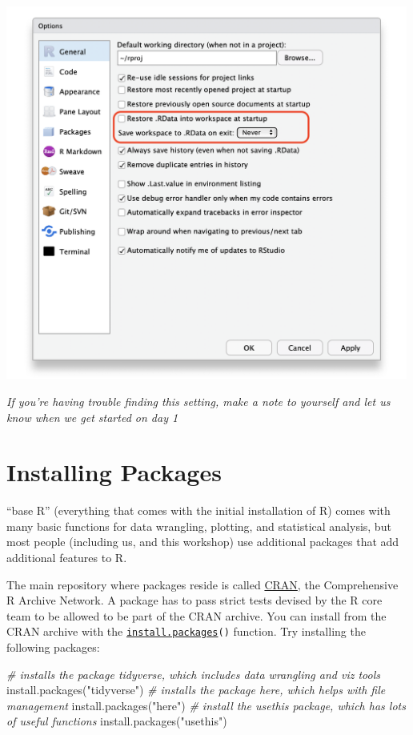 \documentclass[
]{article}
\newenvironment{Shaded}{\begin{snugshade}}{\end{snugshade}}
\newcommand{\CommentTok}[1]{\textcolor[rgb]{0.56,0.35,0.01}{\textit{#1}}}
\newcommand{\FunctionTok}[1]{\textcolor[rgb]{0.00,0.00,0.00}{#1}}
\newcommand{\NormalTok}[1]{#1}
\newcommand{\StringTok}[1]{\textcolor[rgb]{0.31,0.60,0.02}{#1}}
\begin{document}
\includegraphics[width=500px]{images/paste-EA4637C3}

\emph{If you're having trouble finding this setting, make a note to
yourself and let us know when we get started on day 1}

\hypertarget{installing-packages}{%
\section{Installing Packages}\label{installing-packages}}

``base R'' (everything that comes with the initial installation of R)
comes with many basic functions for data wrangling, plotting, and
statistical analysis, but most people (including us, and this workshop)
use additional packages that add additional features to R.

The main repository where packages reside is called
\href{https://psyteachr.github.io/glossary/c\#cran}{CRAN}, the
Comprehensive R Archive Network. A package has to pass strict tests
devised by the R core team to be allowed to be part of the CRAN archive.
You can install from the CRAN archive with the
\href{https://rdrr.io/r/utils/install.packages.html}{\texttt{install.packages}}\texttt{()}
function. Try installing the following packages:

\begin{Shaded}
\begin{Highlighting}[]
\CommentTok{\# installs the package tidyverse, which includes data wrangling and viz tools}
\FunctionTok{install.packages}\NormalTok{(}\StringTok{"tidyverse"}\NormalTok{)}
\CommentTok{\# installs the package here, which helps with file management}
\FunctionTok{install.packages}\NormalTok{(}\StringTok{"here"}\NormalTok{)}
\CommentTok{\# install the usethis package, which has lots of useful functions}
\FunctionTok{install.packages}\NormalTok{(}\StringTok{"usethis"}\NormalTok{)}
\end{Highlighting}
\end{Shaded}
\end{document}
